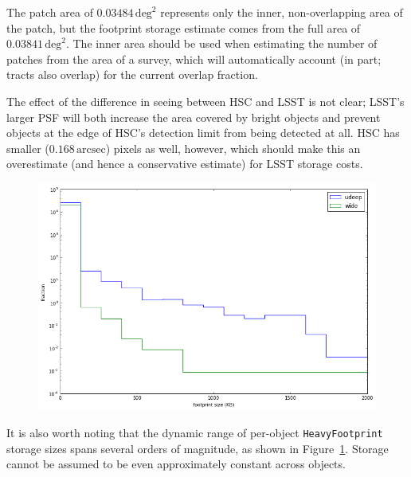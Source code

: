 \documentclass[DM,lsstdraft,toc]{lsstdoc}
\begin{document}
The patch area of $0.03484\,\mathrm{deg}^2$ represents only the inner, non-overlapping area of the patch, but the footprint storage estimate comes from the full area of $0.03841\,\mathrm{deg}^2$.  The inner area should be used when estimating the number of patches from the area of a survey, which will automatically account (in part; tracts also overlap) for the current overlap fraction.

The effect of the difference in seeing between HSC and LSST is not clear; LSST's larger PSF will both increase the area covered by bright objects and prevent objects at the edge of HSC's detection limit from being detected at all.  HSC has smaller ($0.168\,\mathrm{arcsec}$) pixels as well, however, which should make this an overestimate (and hence a conservative estimate) for LSST storage costs.

\begin{figure}
\includegraphics[width=\textwidth]{histogram.png}
\label{fig:histogram}
\end{figure}

It is also worth noting that the dynamic range of per-object \texttt{HeavyFootprint} storage sizes spans several orders of magnitude, as shown in Figure~\ref{fig:histogram}.  Storage cannot be assumed to be even approximately constant across objects.
\end{document}
